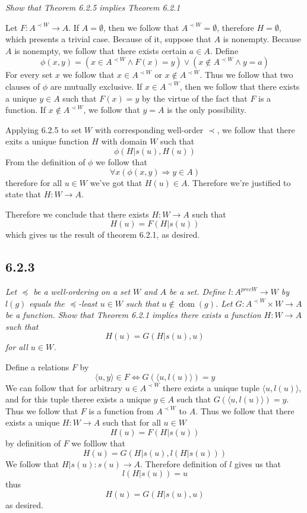 \documentclass[11pt,oneside,titlepage]{book}
\DeclareMathOperator \lra {\Leftrightarrow}
\DeclareMathOperator \ra {\Rightarrow}
\DeclareMathOperator \dom {dom}
\newcommand{\eangle}[1]{\langle #1 \rangle}
\begin{document}
\textit{Show that Theorem 6.2.5 implies Theorem 6.2.1}

Let $F: A^{\prec W} \to A$. If $A = \emptyset$, then we follow that $A^{\prec W} = \emptyset$,
therefore $H = \emptyset$, which presents a trivial case. Because of it, suppose that
$A$ is nonempty. Because $A$ is nonempty, we follow that there exists certain $a \in A$.
Define
$$\phi(x, y) = (x \in A^{\prec W} \land F(x) = y) \lor(x \notin A^{\prec W} \land y = a)$$
For every set $x$ we follow that $x \in A^{\prec W}$ or $x \notin A^{\prec W}$. Thus
we follow that two clauses of $\phi$ are mutually exclusive. 
If $x \in A^{\prec W}$, then we follow that there exists a unique $y \in A$ such that
$F(x) = y$ by the virtue of the fact that $F$ is a function.
If $x \notin A^{\prec W}$, we follow that $y = A$ is the only possibility.

Applying 6.2.5 to set $W$ with corresponding well-order $\prec$, we follow that there
exits a unique function $H$ with domain $W$ such that
$$\phi(H|s(u), H(u))$$
From the definition of $\phi$ we follow that
$$\forall x(\phi(x, y) \ra y \in A)$$
therefore for all $u \in W$ we've got that $H(u) \in A$. Therefore we're justified
to state that $H: W \to A$.

Therefore we conclude that there exists $H: W \to A$ such that
$$H(u) = F(H|s(u))$$
which gives us the result of theorem 6.2.1, as desired.

\subsection*{6.2.3}

\textit{Let $\preceq$ be a well-ordering on a set $W$ and $A$ be a set.
  Define $l: A^{prec W} \to W$ by $l(g)$ equals the $\preceq$-least $u \in W$
  such that $u \notin \dom(g)$. Let $G: A^{\prec W} \times W \to A$ be a function.
  Show that Theorem 6.2.1 implies there exists a function $H: W \to A$ such that
  $$H(u) = G(H|s(u), u)$$
  for all $u \in W$.}

Define a relations $F$ by
$$\eangle{u, y} \in F \lra G(\eangle{u, l(u)}) = y$$
We can follow that for arbitrary $u \in A^{\prec W}$ there exists a unique tuple $\eangle{u, l(u)}$,
and for this tuple theree exists a unique $y \in A$ such that $G(\eangle{u, l(u)}) = y$.
Thus we follow that $F$ is a function from $A^{\prec W}$ to $A$.
Thus we follow that there exists a unique $H: W \to A$ such that for all $u \in W$
$$H(u) = F(H|s(u))$$
by definition of $F$ we folllow that
$$H(u) = G(H|s(u), l(H|s(u)))$$
We follow that $H|s(u): s(u) \to A$. Therefore definition of $l$ gives us that
$$l(H|s(u)) = u$$
thus
$$H(u) = G(H|s(u), u)$$
as desired.
\end{document}
